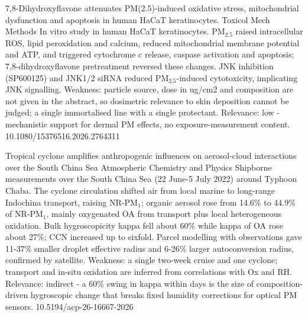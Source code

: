 \documentclass[10pt]{article}
\begin{document}
\par{}\baselineskip{}\baselineskip
{}

{7,8-Dihydroxyflavone attenuates PM(2.5)-induced oxidative stress, mitochondrial dysfunction and apoptosis in human HaCaT keratinocytes.}
{Toxicol Mech Methods}
{In vitro study in human HaCaT keratinocytes. PM$_{2.5}$ raised intracellular ROS, lipid peroxidation and calcium, reduced mitochondrial membrane potential and ATP, and triggered cytochrome c release, caspase activation and apoptosis; 7,8-dihydroxyflavone pretreatment reversed these changes. JNK inhibition (SP600125) and JNK1/2 siRNA reduced PM$_{2.5}$-induced cytotoxicity, implicating JNK signalling. Weakness: particle source, dose in ug/cm2 and composition are not given in the abstract, so dosimetric relevance to skin deposition cannot be judged; a single immortalised line with a single protectant. Relevance: low - mechanistic support for dermal PM effects, no exposure-measurement content.}
{10.1080/15376516.2026.2764311}

\par{}\baselineskip{}\baselineskip
{}

{Tropical cyclone amplifies anthropogenic influences on aerosol-cloud interactions over the South China Sea}
{Atmospheric Chemistry and Physics}
{Shipborne measurements over the South China Sea (22 June-5 July 2022) around Typhoon Chaba. The cyclone circulation shifted air from local marine to long-range Indochina transport, raising NR-PM$_{1}$; organic aerosol rose from 14.6\% to 44.9\% of NR-PM$_{1}$, mainly oxygenated OA from transport plus local heterogeneous oxidation. Bulk hygroscopicity kappa fell about 60\% while kappa of OA rose about 27\%; CCN increased up to sixfold. Parcel modelling with observations gave 11-37\% smaller droplet effective radius and 6-26\% larger autoconversion radius, confirmed by satellite. Weakness: a single two-week cruise and one cyclone; transport and in-situ oxidation are inferred from correlations with Ox and RH. Relevance: indirect - a 60\% swing in kappa within days is the size of composition-driven hygroscopic change that breaks fixed humidity corrections for optical PM sensors.}
{10.5194/acp-26-16667-2026}
\end{document}
